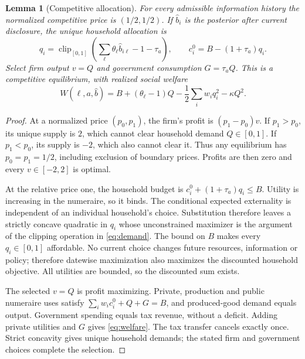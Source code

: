 \documentclass[11pt,a4paper]{article}
\newtheorem{lemma}[theorem]{Lemma}
\newcommand{\clip}{\operatorname{clip}_{[0,1]}}
\begin{document}
\begin{lemma}[Competitive allocation]\label{lem:equilibrium}
For every admissible information history the normalized competitive price is
$(1/2,1/2)$. If $\widehat b_i$ is the posterior after current disclosure, the
unique household allocation is
\begin{equation}\label{eq:demand}
 q_i=\clip\left(\sum_\ell\theta_\ell\widehat b_{i\ell}-1-\tau_a\right),
 \qquad c_i^0=B-(1+\tau_a)q_i.
\end{equation}
Select firm output $v=Q$ and government consumption $G=\tau_aQ$. This is a
competitive equilibrium, with realized social welfare
\begin{equation}\label{eq:welfare}
 W(\ell,a,\widehat b)=B+(\theta_\ell-1)Q
       -\frac12\sum_iw_iq_i^2-\kappa Q^2.
\end{equation}
\end{lemma}
\begin{proof}
At a normalized price $(p_0,p_1)$, the firm's profit is $(p_1-p_0)v$.
If $p_1>p_0$, its unique supply is $2$, which cannot clear household demand
$Q\in[0,1]$. If $p_1<p_0$, its supply is $-2$, which also cannot clear it.
Thus any equilibrium has $p_0=p_1=1/2$, including exclusion of boundary prices.
Profits are then zero and every $v\in[-2,2]$ is optimal.

At the relative price one, the household budget is
$c_i^0+(1+\tau_a)q_i\leq B$. Utility is increasing in the numeraire, so it
binds. The conditional expected externality is independent of an individual
household's choice. Substitution therefore leaves a strictly concave quadratic in $q_i$ whose
unconstrained maximizer is the argument of the clipping operation in
\eqref{eq:demand}. The bound on $B$ makes every $q_i\in[0,1]$ affordable.
No current choice changes future resources, information or policy; therefore
datewise maximization also maximizes the discounted household objective.
All utilities are bounded, so the discounted sum exists.

The selected $v=Q$ is profit maximizing. Private, production and public
numeraire uses satisfy
$\sum_iw_ic_i^0+Q+G=B$, and produced-good demand equals output. Government
spending equals tax revenue, without a deficit. Adding private utilities and
$G$ gives \eqref{eq:welfare}. The tax
transfer cancels exactly once. Strict concavity gives unique household demands;
the stated firm and government choices complete the selection.
\end{proof}
\end{document}
